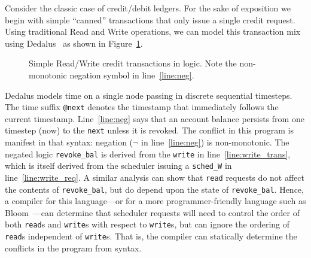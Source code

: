 \documentclass{sig-alternate}
\newcommand{\paa}[1]{{\textcolor{blue}{[[#1 -- paa]]}}}
\begin{document}
Consider the classic case of credit/debit ledgers. For the sake of exposition we begin with simple ``canned'' transactions that only issue a single credit request.  Using
traditional Read and Write operations, we can model this transaction mix using Dedalus~\cite{dedalus} as
shown in Figure~\ref{fig:balance}.

\begin{figure}[ht]
\begin{scriptsize}

\centering
\vspace{-10pt}
\caption{Simple Read/Write credit transactions in logic.  Note the non-monotonic negation symbol in line~\ref{line:neg}.}
\label{fig:balance}
\end{scriptsize}
\vspace{-2pt}
\end{figure}

Dedalus models time on a single node passing in discrete sequential timesteps.
The time suffix \texttt{@next} denotes the timestamp that immediately follows the
current timestamp.  Line~\ref{line:neg} says that an account balance persists from one timestep (now) to the \texttt{next} unless it is revoked. The
conflict in this program is manifest in that syntax: negation
($\neg$ in line~\ref{line:neg}) is non-monotonic.  The negated logic \texttt{revoke\_bal} is derived from the \texttt{write} in line~\ref{line:write_trans}, which is itself derived from the scheduler issuing a \texttt{sched\_W} in line~\ref{line:write_req}.  A similar analysis can show that \texttt{read} requests do not affect the contents of \texttt{revoke\_bal}, but do depend upon the state of \texttt{revoke\_bal}.
Hence, a compiler for this language---or for a more programmer-friendly language
such as Bloom~\cite{Alvaro2011}---can determine that scheduler requests will need to control the order of both \texttt{read}s and \texttt{write}s with respect to \texttt{write}s, but can ignore the ordering of \texttt{read}s independent of \texttt{write}s.  That is, the compiler can statically determine the conflicts in the program from syntax.
\end{document}
